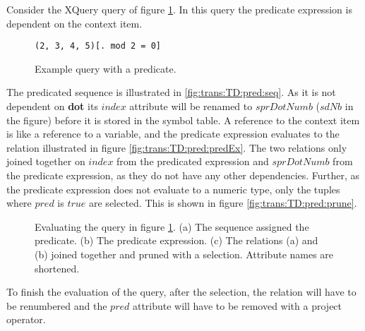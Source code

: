 \begin{myExample}
Consider the XQuery query of figure \ref{fig:trans:TD:predQu}. In this query the predicate expression is dependent
on the context item.
\begin{figure}[h]
\centering
\verb!(2, 3, 4, 5)[. mod 2 = 0]!
\caption{Example query with a predicate. \label{fig:trans:TD:predQu}}
\end{figure}

The predicated sequence is illustrated in \ref{fig:trans:TD:pred:seq}. As it is not dependent on \textbf{dot} its
$index$ attribute will be renamed to $sprDotNumb$ ($sdNb$ in the figure) before it is stored in the symbol table. A
reference to the context item is like a reference to a variable, and the predicate expression evaluates to the
relation illustrated in figure \ref{fig:trans:TD:pred:predEx}. The two relations only joined together on $index$
from the predicated expression and $sprDotNumb$ from the predicate expression, as they do not have any other
dependencies. Further, as the predicate expression does not evaluate to a numeric type, only the tuples where
$pred$ is $true$ are selected. This is shown in figure \ref{fig:trans:TD:pred:prune}.

\begin{figure}[h]
\centering
{}
\quad
{}
\quad
{}
\caption[Evaluating the query in figure \ref{fig:trans:TD:predQu}]{Evaluating the query in figure
\ref{fig:trans:TD:predQu}. (a) The sequence assigned the predicate. (b) The predicate expression. (c) The
relations (a) and (b) joined together and pruned with a selection. Attribute names are shortened.}
\end{figure}

To finish the evaluation of the query, after the selection, the relation will have to be renumbered and the $pred$
attribute will have to be removed with a \textsf{project} operator.

\end{myExample}
